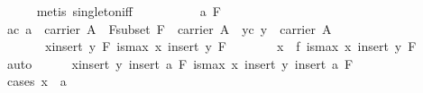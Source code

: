 \begin{isabellebody}
\ \ \ \ \isamarkupfalse%
\ {}metis\ singleton{}iff{}\isanewline
\ \ \isamarkupfalse%
\ {}\isanewline
\ \ \ \ \isamarkupfalse%
\ a\ F\ \isamarkupfalse%
\ ac{}\ {}a\ {}\ carrier\ A{}\ \ F{}subset{}\ {}F\ {}\ carrier\ A{}\ \ yc{}\ {}y\ {}\ carrier\ A{}\isanewline
\ \ \ \ \ \ \ {}{}x{}insert\ y\ F{}\ is{}max\ x\ {}insert\ y\ F{}{}\isanewline
\ \ \ \ \isamarkupfalse%
\ \isamarkupfalse%
\ x\ \ f{}\ {}is{}max\ x\ {}insert\ y\ F{}{}\ \isamarkupfalse%
\ auto\isanewline
\ \ \ \ \isamarkupfalse%
\ {}{}x{}insert\ y\ {}insert\ a\ F{}{}\ is{}max\ x\ {}insert\ y\ {}insert\ a\ F{}{}{}\isanewline
\ \ \ \ \ \ \isamarkupfalse%
\ {}cases\ {}x\ {}\ a{}{}\isanewline

\end{isabellebody}
